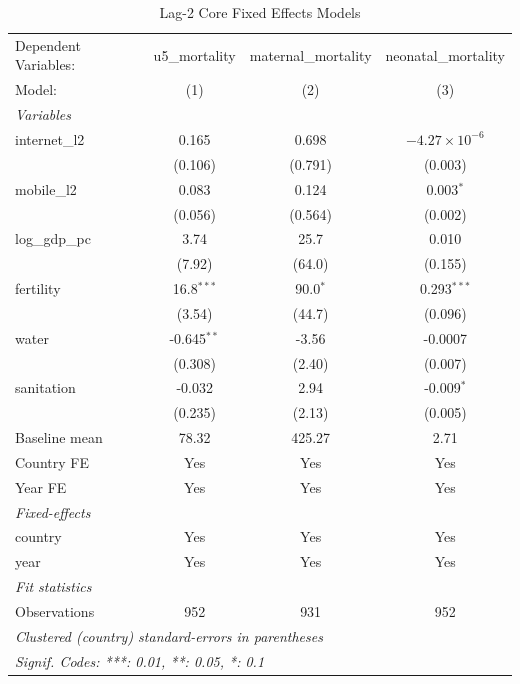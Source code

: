 \begin{table}[htbp]
   \caption{\label{tab:lag2_core} Lag-2 Core Fixed Effects Models}
   \centering
   \begin{tabular}{lccc}
      \tabularnewline \midrule \midrule
      Dependent Variables: & u5\_mortality  & maternal\_mortality  & neonatal\_mortality\\   
      Model:               & (1)            & (2)                  & (3)\\  
      \midrule
      \emph{Variables}\\
      internet\_l2         & 0.165          & 0.698                & $-4.27\times 10^{-6}$\\    
                           & (0.106)        & (0.791)              & (0.003)\\   
      mobile\_l2           & 0.083          & 0.124                & 0.003$^{*}$\\   
                           & (0.056)        & (0.564)              & (0.002)\\   
      log\_gdp\_pc         & 3.74           & 25.7                 & 0.010\\   
                           & (7.92)         & (64.0)               & (0.155)\\   
      fertility            & 16.8$^{***}$   & 90.0$^{*}$           & 0.293$^{***}$\\   
                           & (3.54)         & (44.7)               & (0.096)\\   
      water                & -0.645$^{**}$  & -3.56                & -0.0007\\   
                           & (0.308)        & (2.40)               & (0.007)\\   
      sanitation           & -0.032         & 2.94                 & -0.009$^{*}$\\   
                           & (0.235)        & (2.13)               & (0.005)\\   
      Baseline mean        & 78.32          & 425.27               & 2.71\\  
      Country FE           & Yes            & Yes                  & Yes\\  
      Year FE              & Yes            & Yes                  & Yes\\  
      \midrule
      \emph{Fixed-effects}\\
      country              & Yes            & Yes                  & Yes\\  
      year                 & Yes            & Yes                  & Yes\\  
      \midrule
      \emph{Fit statistics}\\
      Observations         & 952            & 931                  & 952\\  
      \midrule \midrule
      \multicolumn{4}{l}{\emph{Clustered (country) standard-errors in parentheses}}\\
      \multicolumn{4}{l}{\emph{Signif. Codes: ***: 0.01, **: 0.05, *: 0.1}}\\
   \end{tabular}
\end{table}
